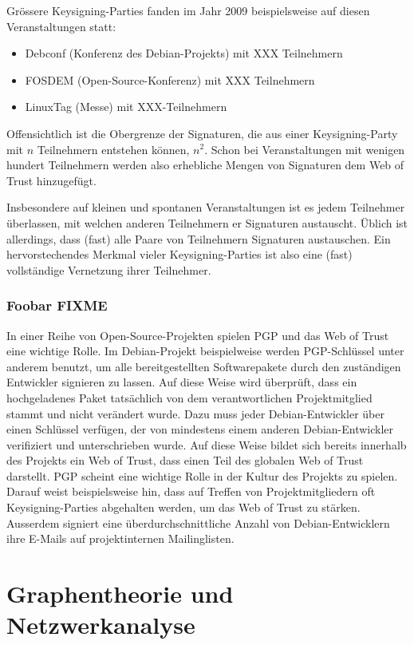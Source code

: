 Gr\"ossere Keysigning-Parties fanden im Jahr 2009 beispielsweise auf
diesen Veranstaltungen statt:
\begin{itemize}
\item Debconf (Konferenz des Debian-Projekts) mit XXX Teilnehmern
\item FOSDEM (Open-Source-Konferenz) mit XXX Teilnehmern
\item LinuxTag (Messe) mit XXX-Teilnehmern
\end{itemize}

Offensichtlich ist die Obergrenze der Signaturen, die aus einer
Keysigning-Party mit $n$ Teilnehmern entstehen k\"onnen, $n^2$. Schon
bei Veranstaltungen mit wenigen hundert Teilnehmern werden also
erhebliche Mengen von Signaturen dem Web of Trust hinzugef\"ugt.

Insbesondere auf kleinen und spontanen Veranstaltungen ist es jedem
Teilnehmer \"uberlassen, mit welchen anderen Teilnehmern er Signaturen
austauscht. \"Ublich ist allerdings, dass (fast) alle Paare von
Teilnehmern Signaturen austauschen. Ein hervorstechendes Merkmal
vieler Keysigning-Parties ist also eine (fast) vollst\"andige
Vernetzung ihrer Teilnehmer.


\subsubsection{Foobar FIXME}
\label{sec:foobar-fixme}

In einer Reihe von Open-Source-Projekten spielen PGP und das Web of
Trust eine wichtige Rolle. Im Debian-Projekt beispielweise werden
PGP-Schl\"ussel unter anderem benutzt, um alle bereitgestellten
Softwarepakete durch den zust\"andigen Entwickler signieren zu
lassen. Auf diese Weise wird \"uberpr\"uft, dass ein hochgeladenes
Paket tats\"achlich von dem verantwortlichen Projektmitglied stammt
und nicht ver\"andert wurde. Dazu muss jeder Debian-Entwickler \"uber
einen Schl\"ussel verf\"ugen, der von mindestens einem anderen
Debian-Entwickler verifiziert und unterschrieben wurde. Auf diese
Weise bildet sich bereits innerhalb des Projekts ein Web of Trust,
dass einen Teil des globalen Web of Trust darstellt. PGP scheint eine
wichtige Rolle in der Kultur des Projekts zu spielen. Darauf weist
beispielsweise hin, dass auf Treffen von Projektmitgliedern oft
Keysigning-Parties abgehalten werden, um das Web of Trust zu
st\"arken. Ausserdem signiert eine \"uberdurchschnittliche Anzahl von
Debian-Entwicklern ihre E-Mails auf projektinternen Mailinglisten.

\section{Graphentheorie und Netzwerkanalyse}
\label{sec:graph-und-netzw}

